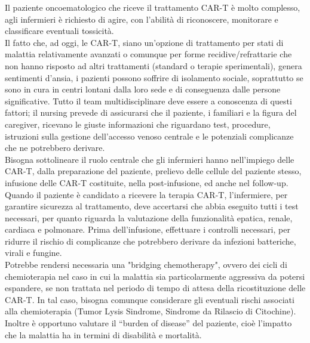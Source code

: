 Il paziente oncoematologico che riceve il trattamento CAR-T è molto complesso, agli infermieri è richiesto 
di agire, con l’abilità di riconoscere, monitorare e classificare eventuali tossicità\cite{NURSINGCART}.\\
Il fatto che, ad oggi, le CAR-T, siano un’opzione di trattamento per stati di malattia relativamente avanzati o comunque 
per forme recidive/refrattarie che non hanno risposto ad altri trattamenti (standard o terapie sperimentali), 
genera sentimenti d’ansia, i pazienti possono soffrire di isolamento sociale, soprattutto se sono in cura in centri 
lontani dalla loro sede e di conseguenza dalle persone significative\cite{NURSINGCART}. Tutto il team multidisciplinare deve essere a 
conoscenza di questi fattori; il nursing prevede di assicurarsi che il paziente, i familiari e la figura del caregiver, 
ricevano le giuste informazioni che riguardano test, procedure, istruzioni sulla gestione dell’accesso 
venoso centrale e le potenziali complicanze che ne potrebbero derivare\cite{NURSINGCART}.\\
Bisogna sottolineare il ruolo centrale che gli infermieri hanno nell’impiego delle CAR-T, dalla preparazione del 
paziente, prelievo delle cellule del paziente stesso, infusione delle CAR-T costituite, nella post-infusione, 
ed anche nel follow-up\cite{NURSINGCART}.\\

Quando il paziente è candidato a ricevere la terapia CAR-T, l’infermiere, per garantire sicurezza al trattamento, 
deve accertarsi che abbia eseguito tutti i test necessari, per quanto riguarda la valutazione della funzionalità epatica, 
renale, cardiaca e polmonare\cite{article2}. Prima dell’infusione, effettuare i controlli necessari, per ridurre il 
rischio di complicanze che potrebbero derivare da infezioni batteriche, virali e fungine\cite{NURSINGCART}.\\
Potrebbe rendersi necessaria una "bridging chemotherapy", ovvero dei cicli di chemioterapia nel caso in cui 
la malattia sia particolarmente aggressiva da potersi espandere, se non trattata nel periodo di tempo di attesa della 
ricostituzione delle CAR-T. In tal caso, bisogna comunque considerare gli eventuali rischi associati alla chemioterapia
(Tumor Lysis Sindrome, Sindrome da Rilascio di Citochine)\cite{article3}.
Inoltre è opportuno valutare il “burden of disease” del paziente, cioè l’impatto che 
la malattia ha in termini di disabilità e mortalità.\\ 

